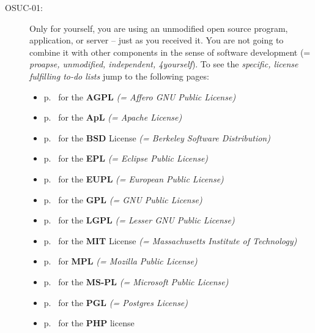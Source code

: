 \begin{description}
\label{OSUCList}
\item[OSUC-01:]\label{OSUC-01-DEF}
Only for yourself, you are using an unmodified open source program, application,
or server -- just as you received it. You are not going to combine it with other
components in the sense of software development (= \textit{proapse, unmodified,
independent, 4yourself}). 
To see the \textit{specific, license fulfilling to-do lists} jump to the
following pages:
  \begin{itemize}
    \item p.\ \pageref{OSUC-01-AGPL} for the \textbf{AGPL}
      \textit{(= Affero GNU Public License)} 
    \item p.\ \pageref{OSUC-01-Apache20} for the \textbf{ApL}
      \textit{(= Apache License)}
    \item p.\ \pageref{OSUC-01-BSD} for the \textbf{BSD} License
      \textit{(= Berkeley Software Distribution)}
    \item p.\ \pageref{OSUC-01-EPL} for the \textbf{EPL}
      \textit{(= Eclipse Public License)}     
    \item p.\ \pageref{OSUC-01-EUPL} for the \textbf{EUPL}
      \textit{(= European Public License)} 
    \item p.\ \pageref{OSUC-01-GPL} for the \textbf{GPL}
       \textit{(= GNU Public License)} 
    \item p.\ \pageref{OSUC-01-LGPL} for the \textbf{LGPL}
      \textit{(= Lesser GNU Public License)}           
    \item p.\ \pageref{OSUC-01-MIT} for the \textbf{MIT} License
       \textit{(= Massachusetts Institute of Technology)} 
    \item p.\ \pageref{OSUC-01-MPL} for \textbf{MPL}
      \textit{(= Mozilla Public License)}     
    \item p.\ \pageref{OSUC-01-MS-PL} for the \textbf{MS-PL}
      \textit{(= Microsoft Public License)} 
    \item p.\ \pageref{OSUC-01-PGL} for the \textbf{PGL}
      \textit{(= Postgres License)} 
    \item p.\ \pageref{OSUC-01-PHP} for the \textbf{PHP} license 
  \end{itemize}


\end{description}
